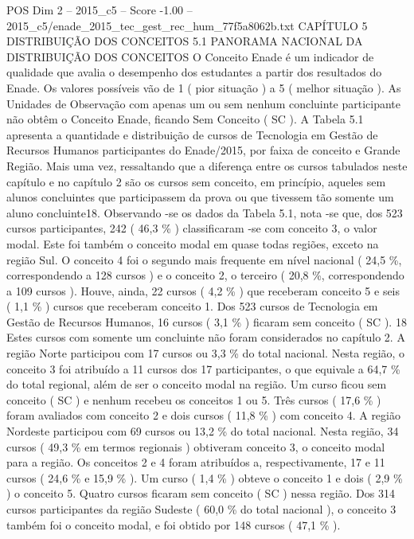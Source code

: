 \begin{textsample}{POS Dim 2 – 2015\_c5 – Score -1.00 – 2015\_c5/enade\_2015\_tec\_gest\_rec\_hum\_77f5a8062b.txt}  \label{ex:f2_pos_276}
CAPÍTULO 5 DISTRIBUIÇÃO DOS CONCEITOS 5.1 PANORAMA NACIONAL DA DISTRIBUIÇÃO DOS CONCEITOS O Conceito Enade é um indicador de qualidade que avalia o desempenho dos estudantes a partir dos resultados do Enade.
Os valores possíveis vão de 1 ( pior situação ) a 5 ( melhor situação ).
As Unidades de Observação com apenas um ou sem nenhum concluinte participante não obtêm o Conceito Enade, ficando Sem Conceito ( SC ).
A Tabela 5.1 apresenta a quantidade e distribuição de cursos de Tecnologia em Gestão de Recursos Humanos participantes do Enade/2015, por faixa de conceito e Grande Região.
Mais uma vez, ressaltando que a diferença entre os cursos tabulados neste capítulo e no capítulo 2 são os cursos sem conceito, em princípio, aqueles sem alunos concluintes que participassem da prova ou que tivessem tão somente um aluno concluinte18.
Observando -se os dados da Tabela 5.1, nota -se que, dos 523 cursos participantes, 242 ( 46,3 \% ) classificaram -se com conceito 3, o valor modal.
Este foi também o conceito modal em quase todas regiões, exceto na região Sul.
O conceito 4 foi o segundo mais frequente em nível nacional ( 24,5 \%, correspondendo a 128 cursos ) e o conceito 2, o terceiro ( 20,8 \%, correspondendo a 109 cursos ).
Houve, ainda, 22 cursos ( 4,2 \% ) que receberam conceito 5 e seis ( 1,1 \% ) cursos que receberam conceito 1.
Dos 523 cursos de Tecnologia em Gestão de Recursos Humanos, 16 cursos ( 3,1 \% ) ficaram sem conceito ( SC ). 18 Estes cursos com somente um concluinte não foram considerados no capítulo 2.
A região Norte participou com 17 cursos ou 3,3 \% do total nacional.
Nesta região, o conceito 3 foi atribuído a 11 cursos dos 17 participantes, o que equivale a 64,7 \% do total regional, além de ser o conceito modal na região.
Um curso ficou sem conceito ( SC ) e nenhum recebeu os conceitos 1 ou 5.
Três cursos ( 17,6 \% ) foram avaliados com conceito 2 e dois cursos ( 11,8 \% ) com conceito 4.
A região Nordeste participou com 69 cursos ou 13,2 \% do total nacional.
Nesta região, 34 cursos ( 49,3 \% em termos regionais ) obtiveram conceito 3, o conceito modal para a região.
Os conceitos 2 e 4 foram atribuídos a, respectivamente, 17 e 11 cursos ( 24,6 \% e 15,9 \% ).
Um curso ( 1,4 \% ) obteve o conceito 1 e dois ( 2,9 \% ) o conceito 5.
Quatro cursos ficaram sem conceito ( SC ) nessa região.
Dos 314 cursos participantes da região Sudeste ( 60,0 \% do total nacional ), o conceito 3 também foi o conceito modal, e foi obtido por 148 cursos ( 47,1 \% ).

\end{textsample}
